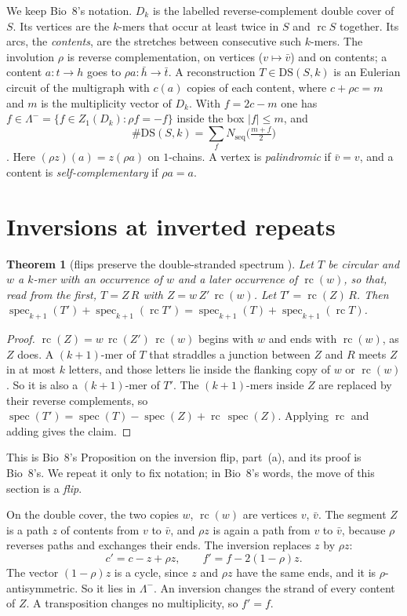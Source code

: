 \documentclass[11pt]{article}
\theoremstyle{plain}
\newtheorem{theorem}{Theorem}
\theoremstyle{definition}
\theoremstyle{remark}
\newcommand{\spec}{\operatorname{spec}}
\newcommand{\DS}{\mathrm{DS}}
\newcommand{\Lm}{\Lambda^{-}}
\newcommand{\Nseq}{N_{\mathrm{seq}}}
\newcommand{\rc}{\operatorname{rc}}
\begin{document}
We keep Bio~8's notation. $D_k$ is the labelled reverse-complement double cover of $S$. Its vertices are
the $k$-mers that occur at least twice in $S$ and $\rc S$ together. Its arcs, the \emph{contents}, are
the stretches between consecutive such $k$-mers. The involution $\rho$ is reverse complementation, on
vertices ($v\mapsto\bar v$) and on contents; a content $a\colon t\to h$ goes to
$\rho a\colon\bar h\to\bar t$. A reconstruction $T\in\DS(S,k)$ is an Eulerian circuit of the multigraph
with $c(a)$ copies of each content, where $c+\rho c=m$ and $m$ is the multiplicity vector of $D_k$. With
$f=2c-m$ one has $f\in\Lm=\{f\in Z_1(D_k):\rho f=-f\}$ inside the box $|f|\le m$, and
\[
\#\DS(S,k)=\sum_f\Nseq\bigl(\tfrac{m+f}2\bigr)
\]
\cite{Bio8}. Here $(\rho z)(a)=z(\rho a)$ on $1$-chains. A vertex is \emph{palindromic} if $\bar v=v$, and
a content is \emph{self-complementary} if $\rho a=a$.

\section{Inversions at inverted repeats}\label{sec:inv}

\begin{theorem}[flips preserve the double-stranded spectrum {\cite[Prop.~(flip)(a)]{Bio8}}]\label{thm:inv}
Let $T$ be circular and $w$ a $k$-mer with an occurrence of $w$ and a later occurrence of $\rc(w)$, so
that, read from the first, $T=Z\,R$ with $Z=w\,Z'\,\rc(w)$. Let $T'=\rc(Z)\,R$. Then
$\spec_{k+1}(T')+\spec_{k+1}(\rc T')=\spec_{k+1}(T)+\spec_{k+1}(\rc T)$.
\end{theorem}

\begin{proof}
$\rc(Z)=w\,\rc(Z')\,\rc(w)$ begins with $w$ and ends with $\rc(w)$, as $Z$ does. A $(k+1)$-mer of $T$ that
straddles a junction between $Z$ and $R$ meets $Z$ in at most $k$ letters, and those letters lie inside
the flanking copy of $w$ or $\rc(w)$. So it is also a $(k+1)$-mer of $T'$. The $(k+1)$-mers inside $Z$ are
replaced by their reverse complements, so
$\spec(T')=\spec(T)-\spec(Z)+\rc\,\spec(Z)$. Applying $\rc$ and adding gives the claim.
\end{proof}

This is Bio~8's Proposition on the inversion flip, part~(a), and its proof is Bio~8's. We repeat it only
to fix notation; in Bio~8's words, the move of this section is a \emph{flip}.

On the double cover, the two copies $w$, $\rc(w)$ are vertices $v$, $\bar v$. The segment $Z$ is a path
$z$ of contents from $v$ to $\bar v$, and $\rho z$ is again a path from $v$ to $\bar v$, because $\rho$
reverses paths and exchanges their ends. The inversion replaces $z$ by $\rho z$:
\begin{equation}\label{eq:move}
c'=c-z+\rho z,\qquad f'=f-2(1-\rho)z .
\end{equation}
The vector $(1-\rho)z$ is a cycle, since $z$ and $\rho z$ have the same ends, and it is $\rho$-antisymmetric.
So it lies in $\Lm$. An inversion changes the strand of every content of $Z$. A transposition changes no
multiplicity, so $f'=f$.
\end{document}
